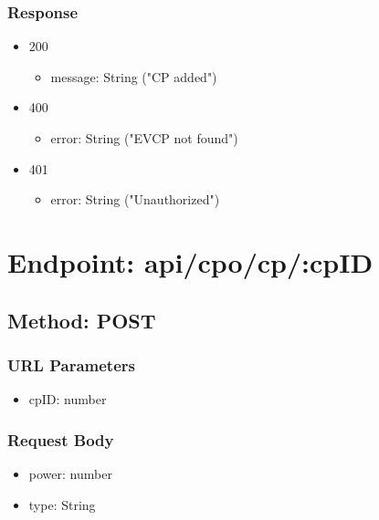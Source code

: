 \subsubsection*{Response}
\begin{itemize}
    \item 200
          \begin{itemize}
              \item message: String ("CP added")
          \end{itemize}
    \item 400
          \begin{itemize}
              \item error: String ("EVCP not found")
          \end{itemize}
    \item 401
          \begin{itemize}
              \item error: String ("Unauthorized")
          \end{itemize}
\end{itemize}

\section*{Endpoint: api/cpo/cp/:cpID}
\subsection*{Method: POST}
\subsubsection*{URL Parameters}
\begin{itemize}
    \item cpID: number
\end{itemize}
\subsubsection*{Request Body}
\begin{itemize}
    \item power: number
    \item type: String
\end{itemize}

